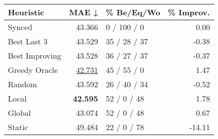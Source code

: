 \begin{tabular}{lrlr}
\toprule
\textbf{Heuristic} & \textbf{MAE ↓} & \textbf{\% Be/Eq/Wo} & \textbf{\% Improv.} \\
\midrule
            Synced &         43.366 &          0 / 100 / 0 &                0.00 \\
\midrule
       Best Last 3 &         43.529 &         35 / 28 / 37 &               -0.38 \\
    Best Improving &         43.528 &         36 / 27 / 37 &               -0.37 \\
\addlinespace
     Greedy Oracle &         \underline{42.731} &          45 / 55 / 0 &                1.47 \\
            Random &         43.592 &         26 / 40 / 34 &               -0.52 \\
\midrule
             Local &         \textbf{42.595} &          52 / 0 / 48 &                1.78 \\
            Global &         43.074 &          52 / 0 / 48 &                0.67 \\
\midrule
            Static &         49.484 &          22 / 0 / 78 &              -14.11 \\
\bottomrule
\end{tabular}

\label{tab:iid_lr05_le1_bs2_Summary}
